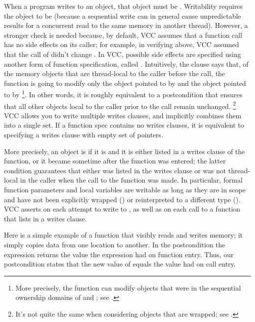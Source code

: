 When a program writes to an object, that object must be
. Writability requires the object to be \vcc{\mutable}
(because a sequential write can in general cause unpredictable results
for a concurrent read to the same memory in another thread). 
However, a stronger check is needed because, by default, VCC assumes that a
function call has no side effects on its caller; for example, in
verifying  above, VCC assumed that the call of
 didn't change . 
In VCC, possible side effects are specified using 
another form of function specification, called .
Intuitively, the clause  says that, 
of the memory objects that are thread-local to the caller before the call,
the function is going to modify only the object pointed to by 
and the object pointed to by %
\footnote{More precisely, the function can modify objects that were in
  the sequential ownership domains of  and ; see 
  .}.
In other words, it is roughly equivalent to a postcondition that ensures
that all other objects local to the caller prior
to the call remain unchanged.%
\footnote{It's not quite the same when considering objects that are
  wrapped; see .}  VCC allows you
to write multiple writes clauses, and implicitly
combines them into a single set. If a function spec contains no writes clauses, 
it is equivalent to specifying a writes clause with empty set of
pointers.

More precisely, an object is \vcc{\writable} if it is \vcc{\mutable} and 
it is either listed in a writes clause of the function,
or it became \vcc{\mutable} sometime after the function was entered; the 
latter condition guarantees that either  was listed in the
writes clause or was not thread-local in the caller when the call to
the function was made. 
In particular, formal function parameters and local variables are
writable as long as they are in scope and have not been explicitly
wrapped () or reinterpreted to a
different type ().  VCC asserts
 on each attempt to write to , as well as on
each call to a function that lists  in a writes clause.

Here is a simple example of a function that visibly reads and writes
memory; it simply copies data from one location to another.
In the postcondition the expression  returns the value
the expression  had on function entry.
Thus, our postcondition states that the new value of 
equals the value  had on call entry. 

